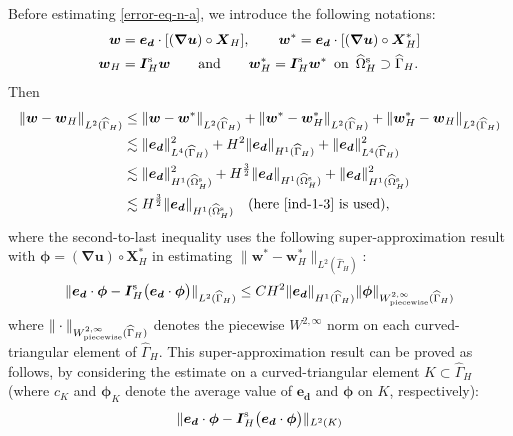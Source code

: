 \documentclass[11pt,reqno]{amsart}
\theoremstyle{definition}
\theoremstyle{plain}
\numberwithin{theorem}{section}
\numberwithin{proposition}{section}
\numberwithin{lemma}{section}
\numberwithin{equation}{section}
\newcommand{\bs}[1]{\boldsymbol{#1}}
\newcommand{\uu}[1]  {{\bs{#1}} }
\newcommand{\dep}{{{\bs{d}}}}
\newcommand{\grad}   { \uu{\nabla}    }
\renewcommand{\(}{\bigl(}
\renewcommand{\)}{\bigr)}
\begin{document}
\begin{itemize}[leftmargin=20pt]
Before estimating \eqref{error-eq-n-a}, we introduce the following notations: 
\begin{align*}
{\bs w}&={\bs e}_\dep\cdot[(\grad {\bs u})\circ{\bs X}_H],\qquad {\bs w}^*={\bs e}_\dep\cdot[(\grad {\bs u})\circ{\bs X}_H^*] \\
{\bs w}_H&={\bs I}_H^{\rm s} {\bs w}
\qquad\mbox{and}\qquad {\bs w}_H^*={\bs I}_H^{\rm s} {\bs w}^* \,\,\,\mbox{on}\,\,\,\widehat\Omega^{\rm s}_H\supset\widehat\Gamma_H.
\end{align*}
Then 
\begin{align}\label{w-wH-L2}
\|{\bs w}-{\bs w}_H\|_{L^2(\widehat\Gamma_H)}
&\le
\|{\bs w}-{\bs w}^*\|_{L^2(\widehat\Gamma_H)}
+\|{\bs w}^*-{\bs w}_H^*\|_{L^2(\widehat\Gamma_H)}
+\|{\bs w}_H^* - {\bs w}_H\|_{L^2(\widehat\Gamma_H)} \notag\\ 
&\lesssim \|{\bs e}_\dep\|_{L^4(\widehat\Gamma_H)}^2 
+ H^{2} \|{\bs e}_\dep\|_{H^1(\widehat\Gamma_H)} 
+ \|{\bs e}_\dep\|_{L^4(\widehat\Gamma_H)}^2  \notag\\
&\lesssim \|{\bs e}_\dep\|_{H^1(\widehat{\Omega}^{\rm s}_H)}^2 + H^{\frac32} \|{\bs e}_\dep\|_{H^1(\widehat{\Omega}^{\rm s}_H)} + \|{\bs e}_\dep\|_{H^1(\widehat{\Omega}^{\rm s}_H)}^2 \notag\\
&\lesssim H^{\frac32} \|{\bs e}_\dep\|_{H^1(\widehat{\Omega}^{\rm s}_H)} 
\quad\mbox{(here \eqref{ind-1-3} is used)}, 
\end{align}
where the second-to-last inequality uses the following super-approximation result with ${\bs\phi}=(\grad {\bs u})\circ{\bs X}_H^*$ in estimating $\|{\bs w}^*-{\bs w}_H^*\|_{L^2(\widehat\Gamma_H)}$:
\begin{align}\label{super-approx}
\|{\bs e}_\dep \cdot {\bs\phi} - {\bs I}_H^{\rm s} \big( {\bs e}_\dep \cdot {\bs\phi}\big)\|_{L^2(\widehat\Gamma_H)} 
\le CH^2\|{\bs e}_\dep \|_{H^1(\widehat\Gamma_H)} \|{\bs\phi}\|_{W^{2,\infty}_{\rm piecewise}(\widehat\Gamma_H)} 
\end{align}
where $\|\cdot\|_{W^{2,\infty}_{\rm piecewise}(\widehat\Gamma_H)}$ denotes the piecewise $W^{2,\infty}$ norm on each curved-triangular element of $\widehat\Gamma_H$. This super-approximation result can be proved as follows, by considering the estimate on a curved-triangular element $K\subset\widehat\Gamma_H$ (where $c_K$ and ${\bs\phi}_K$ denote the average value of ${\bs e}_{\bs d}$ and ${\bs\phi}$ on $K$, respectively):
\begin{align*}
&\|{\bs e}_\dep \cdot {\bs\phi} - {\bs I}_H^{\rm s} \big( {\bs e}_\dep \cdot {\bs\phi}\big)\|_{L^2(K)} \\

\end{align*}
\end{itemize}
\end{document}
